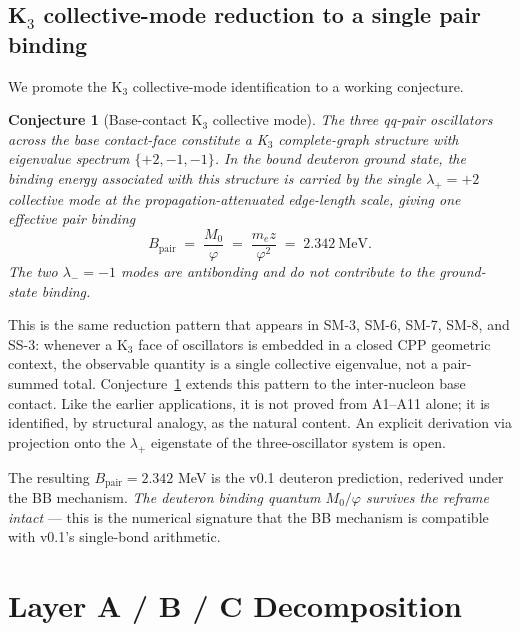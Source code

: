 \documentclass[11pt,letterpaper]{article}
\newtheorem{conjecture}[theorem]{Conjecture}
\newcommand{\phig}{\varphi}
\newcommand{\Mzero}{M_0}
\newcommand{\Bpair}{B_{\mathrm{pair}}}
\begin{document}
\subsection{K$_3$ collective-mode reduction to a single pair binding}
\label{sec:K3_reduction}

We promote the K$_3$ collective-mode identification to a working conjecture.

\begin{conjecture}[Base-contact K$_3$ collective mode]
\label{conj:K3_base}
The three qq-pair oscillators across the base contact-face constitute a K$_3$ complete-graph structure with eigenvalue spectrum $\{+2, -1, -1\}$. In the bound deuteron ground state, the binding energy associated with this structure is carried by the single $\lambda_+ = +2$ collective mode at the propagation-attenuated edge-length scale, giving one effective pair binding
\begin{equation}
\Bpair \;=\; \frac{\Mzero}{\phig} \;=\; \frac{m_e z}{\phig^2} \;=\; 2.342~\mathrm{MeV}.
\label{eq:Bpair}
\end{equation}
The two $\lambda_- = -1$ modes are antibonding and do not contribute to the ground-state binding.
\end{conjecture}

This is the same reduction pattern that appears in SM-3, SM-6, SM-7, SM-8, and SS-3: whenever a K$_3$ face of oscillators is embedded in a closed CPP geometric context, the observable quantity is a single collective eigenvalue, not a pair-summed total. Conjecture~\ref{conj:K3_base} extends this pattern to the inter-nucleon base contact. Like the earlier applications, it is not proved from A1--A11 alone; it is identified, by structural analogy, as the natural content. An explicit derivation via projection onto the $\lambda_+$ eigenstate of the three-oscillator system is open.

The resulting $\Bpair = 2.342$ MeV is the v0.1 deuteron prediction, rederived under the BB mechanism. \emph{The deuteron binding quantum $\Mzero/\phig$ survives the reframe intact} --- this is the numerical signature that the BB mechanism is compatible with v0.1's single-bond arithmetic.

\section{Layer A / B / C Decomposition}
\label{sec:layers}
\end{document}
